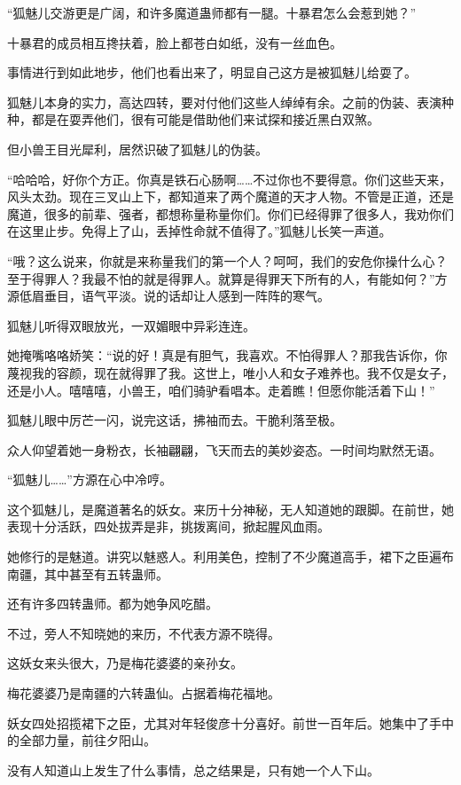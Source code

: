 \begin{this_body}
“狐魅儿交游更是广阔，和许多魔道蛊师都有一腿。十暴君怎么会惹到她？”

十暴君的成员相互搀扶着，脸上都苍白如纸，没有一丝血色。

事情进行到如此地步，他们也看出来了，明显自己这方是被狐魅儿给耍了。

狐魅儿本身的实力，高达四转，要对付他们这些人绰绰有余。之前的伪装、表演种种，都是在耍弄他们，很有可能是借助他们来试探和接近黑白双煞。

但小兽王目光犀利，居然识破了狐魅儿的伪装。

“哈哈哈，好你个方正。你真是铁石心肠啊……不过你也不要得意。你们这些天来，风头太劲。现在三叉山上下，都知道来了两个魔道的天才人物。不管是正道，还是魔道，很多的前辈、强者，都想称量称量你们。你们已经得罪了很多人，我劝你们在这里止步。免得上了山，丢掉性命就不值得了。”狐魅儿长笑一声道。

“哦？这么说来，你就是来称量我们的第一个人？呵呵，我们的安危你操什么心？至于得罪人？我最不怕的就是得罪人。就算是得罪天下所有的人，有能如何？”方源低眉垂目，语气平淡。说的话却让人感到一阵阵的寒气。

狐魅儿听得双眼放光，一双媚眼中异彩连连。

她掩嘴咯咯娇笑：“说的好！真是有胆气，我喜欢。不怕得罪人？那我告诉你，你蔑视我的容颜，现在就得罪了我。这世上，唯小人和女子难养也。我不仅是女子，还是小人。嘻嘻嘻，小兽王，咱们骑驴看唱本。走着瞧！但愿你能活着下山！”

狐魅儿眼中厉芒一闪，说完这话，拂袖而去。干脆利落至极。

众人仰望着她一身粉衣，长袖翩翩，飞天而去的美妙姿态。一时间均默然无语。

“狐魅儿……”方源在心中冷哼。

这个狐魅儿，是魔道著名的妖女。来历十分神秘，无人知道她的跟脚。在前世，她表现十分活跃，四处拔弄是非，挑拨离间，掀起腥风血雨。

她修行的是魅道。讲究以魅惑人。利用美色，控制了不少魔道高手，裙下之臣遍布南疆，其中甚至有五转蛊师。

还有许多四转蛊师。都为她争风吃醋。

不过，旁人不知晓她的来历，不代表方源不晓得。

这妖女来头很大，乃是梅花婆婆的亲孙女。

梅花婆婆乃是南疆的六转蛊仙。占据着梅花福地。

妖女四处招揽裙下之臣，尤其对年轻俊彦十分喜好。前世一百年后。她集中了手中的全部力量，前往夕阳山。

没有人知道山上发生了什么事情，总之结果是，只有她一个人下山。


\end{this_body}
